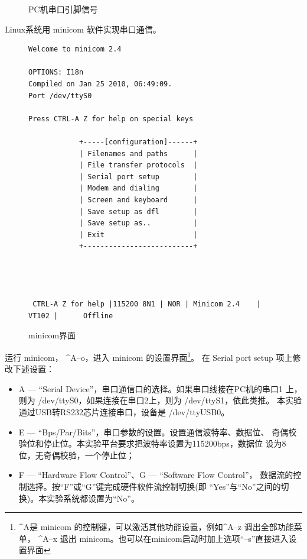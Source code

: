 \begin{figure}
\caption{PC机串口引脚信号}\label{pc-serial}
\end{figure}

Linux系统用 minicom 软件实现串口通信。

\begin{figure}
\centering \fontsize{10}{10}\selectfont
\begin{boxedminipage}{.96\textwidth}
\begin{verbatim}
Welcome to minicom 2.4

OPTIONS: I18n
Compiled on Jan 25 2010, 06:49:09.
Port /dev/ttyS0

Press CTRL-A Z for help on special keys

            +-----[configuration]------+
            | Filenames and paths      |
            | File transfer protocols  |
            | Serial port setup        |
            | Modem and dialing        |
            | Screen and keyboard      |
            | Save setup as dfl        |
            | Save setup as..          |
            | Exit                     |
            +--------------------------+




 CTRL-A Z for help |115200 8N1 | NOR | Minicom 2.4    | VT102 |      Offline
\end{verbatim}
\end{boxedminipage}
\caption{minicom界面}
\end{figure}

    运行 minicom， \^{}A--o，进入 minicom 的设置界面\footnote{\^{}A是
minicom 的控制键，可以激活其他功能设置，例如\^{}A--z 调出全部功能菜单，
\^{}A--x 退出 minicom。也可以在minicom启动时加上选项``--s''直接进入设置界面}。
在 Serial port setup 项上修改下述设置：
\begin{itemize}
  \item A --- ``Serial Device''，串口通信口的选择。如果串口线接在PC机的串口1
		上，则为 /dev/ttyS0，如果连接在串口2上，则为 /dev/ttyS1，依此类推。
		本实验通过USB转RS232芯片连接串口，设备是 /dev/ttyUSB0。
  \item E --- ``Bps/Par/Bits''，串口参数的设置。设置通信波特率、数据位、
		奇偶校验位和停止位。本实验平台要求把波特率设置为115200bps，数据位
		设为8位，无奇偶校验，一个停止位；
  \item F --- ``Hardware Flow Control''、G --- ``Software Flow Control''，
		数据流的控制选择。按``F''或``G''键完成硬件软件流控制切换(即
		``Yes''与``No''之间的切换)。本实验系统都设置为``No''。
\end{itemize}

